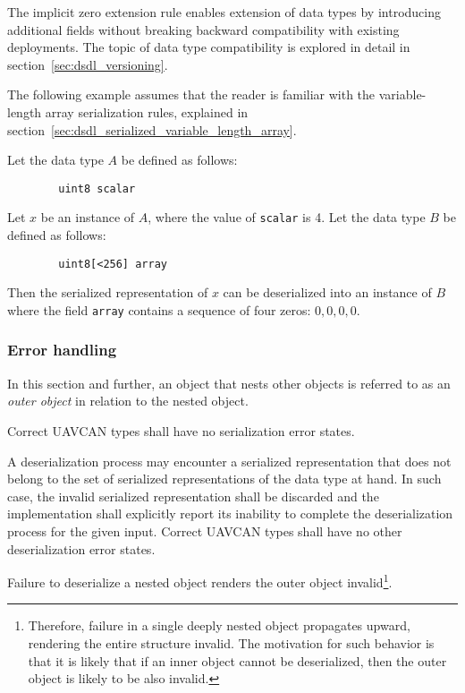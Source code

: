 \begin{remark}
    The implicit zero extension rule enables extension of data types by introducing additional fields
    without breaking backward compatibility with existing deployments.
    The topic of data type compatibility is explored in detail in section~\ref{sec:dsdl_versioning}.

    The following example assumes that the reader is familiar with the variable-length array serialization rules,
    explained in section~\ref{sec:dsdl_serialized_variable_length_array}.

    Let the data type $A$ be defined as follows:

    \begin{verbatim}
        uint8 scalar
    \end{verbatim}

    Let $x$ be an instance of $A$, where the value of \verb|scalar| is 4.
    Let the data type $B$ be defined as follows:

    \begin{verbatim}
        uint8[<256] array
    \end{verbatim}

    Then the serialized representation of $x$ can be deserialized into an instance of $B$ where the field
    \verb|array| contains a sequence of four zeros: $0, 0, 0, 0$.
\end{remark}

\subsubsection{Error handling}\label{sec:dsdl_serialized_error}

In this section and further, an object that nests other objects is referred to as an \emph{outer object}
in relation to the nested object.

Correct UAVCAN types shall have no serialization error states.

A deserialization process may encounter a serialized representation that does not belong to the
set of serialized representations of the data type at hand.
In such case, the invalid serialized representation shall be discarded and the implementation
shall explicitly report its inability to complete the deserialization process for the given input.
Correct UAVCAN types shall have no other deserialization error states.

Failure to deserialize a nested object renders the outer object invalid\footnote{%
    Therefore, failure in a single deeply nested object propagates upward, rendering the entire structure invalid.
    The motivation for such behavior is that it is likely that if an inner object cannot be deserialized,
    then the outer object is likely to be also invalid.
}.

